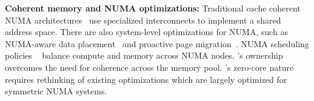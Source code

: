 \vfive
{\ni\bf Coherent memory and NUMA optimizations:}
%
Traditional cache coherent NUMA architectures~\cite{ccnuma.isca97} use
specialized interconnects to implement a shared address space.
There are also system-level optimizations for NUMA, such as
NUMA-aware data placement~\cite{asymmemplacement.atc15} and proactive page
migration~\cite{autonuma.web19}.
%
NUMA scheduling policies ~\cite{corbet2012autonuma,rao2010vnuma,liu2014optimizing} balance compute and memory across NUMA nodes.
\sys's ownership overcomes the need for coherence across the memory pool.
\cvn's zero-core nature
requires rethinking of existing optimizations which are largely
optimized for symmetric NUMA systems.




%
%



